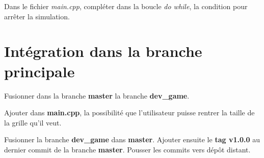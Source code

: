 \medskip

Dans le fichier \textit{main.cpp}, compléter dans la boucle \textit{do while}, la condition pour arrêter la simulation.

\section{Intégration dans la branche principale}
Fusionner dans la branche \textbf{master} la branche \textbf{dev\_game}.

Ajouter dans \textbf{main.cpp}, la possibilité que l'utilisateur puisse rentrer la taille de la grille qu'il veut.

\medskip

Fusionner la branche \textbf{dev\_game} dans \textbf{master}. Ajouter ensuite le \textbf{tag v1.0.0} au dernier commit de la branche \textbf{master}. Pousser les commits vers dépôt distant.